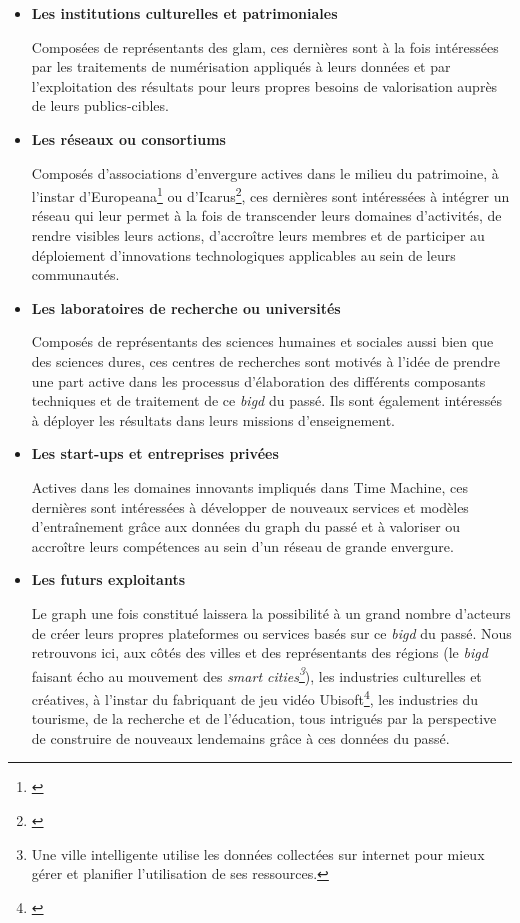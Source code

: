 \begin{itemize}
\item \textbf{Les institutions culturelles et patrimoniales}

Composées de représentants des \gls{glam}, ces dernières sont à la fois intéressées par les traitements de numérisation appliqués à leurs données et par l'exploitation des résultats pour leurs propres besoins de valorisation auprès de leurs publics-cibles.
\item \textbf{Les réseaux ou consortiums}

Composés d'associations d'envergure actives dans le milieu du patrimoine, à l'instar d'Europeana\footnote{\cite{noauthor_europeana_nodate}} ou d'Icarus\footnote{\cite{icarus_icarus_nodate}}, ces dernières sont intéressées à intégrer un réseau qui leur permet à la fois de transcender leurs domaines d'activités, de rendre visibles leurs actions, d'accroître leurs membres et de participer au déploiement d'innovations technologiques applicables au sein de leurs communautés.
\item \textbf{Les laboratoires de recherche ou universités}

Composés de représentants des sciences humaines et sociales aussi bien que des sciences dures, ces centres de recherches sont motivés à l'idée de prendre une part active dans les processus d'élaboration des différents composants techniques et de traitement de ce \textit{\gls{bigd}} du passé. Ils sont également intéressés à déployer les résultats dans leurs missions d'enseignement.
\item \textbf{Les start-ups et entreprises privées}

Actives dans les domaines innovants impliqués dans Time Machine, ces dernières sont intéressées à développer de nouveaux services et modèles d'entraînement grâce aux données du \gls{graph} du passé et à valoriser ou accroître leurs compétences au sein d'un réseau de grande envergure.
\item \textbf{Les futurs exploitants}

Le \gls{graph} une fois constitué laissera la possibilité à un grand nombre d'acteurs de créer leurs propres plateformes ou services basés sur ce \textit{\gls{bigd}} du passé. Nous retrouvons ici, aux côtés des villes et des représentants des régions (le \textit{\gls{bigd}} faisant écho au mouvement des \textit{smart cities\footnote{Une ville intelligente utilise les données collectées sur internet pour mieux gérer et planifier l'utilisation de ses ressources.}}), les industries culturelles et créatives, à l'instar du fabriquant de jeu vidéo Ubisoft\footnote{\cite{ubisoft_welcome_nodate}}, les industries du tourisme, de la recherche et de l'éducation, tous intrigués par la perspective de construire de nouveaux lendemains grâce à ces données du passé.
\end{itemize}

